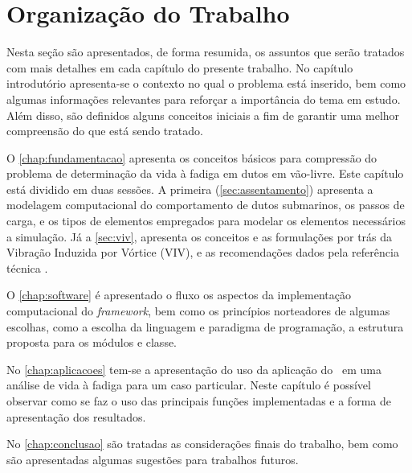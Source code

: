 \section{Organização do Trabalho}

Nesta seção são apresentados, de forma resumida, os assuntos que serão tratados com mais detalhes em cada capítulo do presente trabalho. No capítulo introdutório apresenta-se o contexto no qual o problema está inserido, bem como algumas informações relevantes para reforçar a importância do tema em estudo. Além disso, são definidos alguns conceitos iniciais a fim de garantir uma melhor compreensão do que está sendo tratado.

O \autoref{chap:fundamentacao} apresenta os conceitos básicos para compressão do problema de determinação da vida à fadiga em dutos em vão-livre. Este capítulo está dividido em duas sessões. A primeira (\autoref{sec:assentamento}) apresenta a modelagem computacional do comportamento de dutos submarinos, os passos de carga, e os tipos de elementos empregados para modelar os elementos necessários a simulação. Já a \autoref{sec:viv}, apresenta os conceitos e as formulações por trás da Vibração Induzida por Vórtice (VIV), e as recomendações dados pela referência técnica .

O \autoref{chap:software} é apresentado o fluxo  os aspectos da implementação computacional do \textit{framework}, bem como os princípios norteadores de algumas escolhas, como a escolha da linguagem e paradigma de programação, a estrutura proposta para os módulos e classe.

No \autoref{chap:aplicacoes} tem-se a apresentação do uso da aplicação do \frame\ em uma análise de vida à fadiga para um caso particular. Neste capítulo é possível observar como se faz o uso das principais funções implementadas e a forma de apresentação dos resultados.

No \autoref{chap:conclusao} são tratadas as considerações finais do trabalho, bem como são apresentadas algumas sugestões para trabalhos futuros.